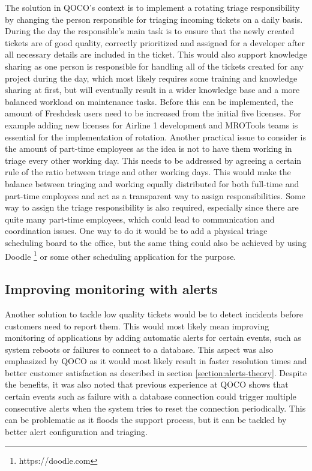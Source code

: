 The solution in QOCO's context is to implement a rotating triage responsibility by changing the person responsible for triaging incoming tickets on a daily basis. During the day the
responsible's main task is to ensure that the newly created tickets are of good quality, correctly prioritized and assigned for a developer after all necessary details
are included in the ticket. This would also support knowledge sharing as one person is responsible for handling all of the tickets created for any project during the day, which
most likely requires some training and knowledge sharing at first, but will eventually result in a wider knowledge base and a more balanced workload on maintenance tasks. Before this
can be implemented, the amount of Freshdesk users need to be increased from the initial five licenses. For example adding
new licenses for Airline 1 development and MROTools teams is essential for the implementation of rotation. Another practical issue
to consider is the amount of part-time employees as the idea is not to have them working in triage every other working day. This needs to be addressed by agreeing a certain
rule of the ratio between triage and other working days. This would make the balance between triaging and working equally distributed for both full-time and part-time employees
and act as a transparent way to assign responsibilities. Some way to assign the triage
responsibility is also required, especially since there are quite many part-time employees, which could lead to communication and coordination issues. One way to do it would be
to add a physical triage scheduling board to the office, but the same thing could also be achieved by using Doodle \footnote{https://doodle.com} or some other scheduling application for
the purpose.

\subsection{Improving monitoring with alerts}
\label{section:alerts}

Another solution to tackle low quality tickets would be to detect incidents before customers need to report them. This would most likely mean improving monitoring of applications
by adding automatic alerts for certain events, such as system reboots or failures to connect to a database. This aspect was also emphasized by QOCO as it would most likely result in
faster resolution times and better customer satisfaction as described in section \ref{section:alerts-theory}. Despite the benefits, it was also noted that previous
experience at QOCO shows that certain events such as failure with a database connection could trigger multiple consecutive alerts when the system tries to reset the connection
periodically. This can be problematic as it floods the support process, but it can be tackled by better alert configuration and triaging.

